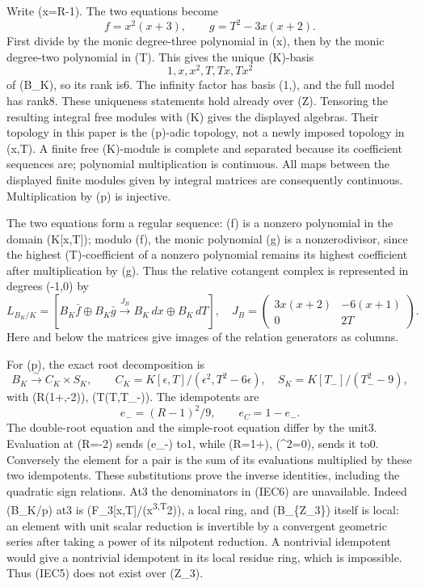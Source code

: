 \documentclass[
]{article}
\begin{document}
Write (x=R-1). The two equations become \[
f=x^2(x+3),\qquad g=T^2-3x(x+2).
\tag{IEC2}
\] First divide by the monic degree-three polynomial in (x), then by the
monic degree-two polynomial in (T). This gives the unique (K)-basis \[
1,x,x^2,T,Tx,Tx^2
\tag{IEC3}
\] of (B\_K), so its rank is6. The infinity factor has basis (1,\Theta),
and the full model has rank8. These uniqueness statements hold already
over (\mathbb Z). Tensoring the resulting integral free modules with (K)
gives the displayed algebras. Their topology in this paper is the
(p)-adic topology, not a newly imposed topology in (x,T). A finite free
(K)-module is complete and separated because its coefficient sequences
are; polynomial multiplication is continuous. All maps between the
displayed finite modules given by integral matrices are consequently
continuous. Multiplication by (p) is injective.

The two equations form a regular sequence: (f) is a nonzero polynomial
in the domain (K{[}x,T{]}); modulo (f), the monic polynomial (g) is a
nonzerodivisor, since the highest (T)-coefficient of a nonzero
polynomial remains its highest coefficient after multiplication by (g).
Thus the relative cotangent complex is represented in degrees (-1,0) by
\[
L_{B_K/K}=\left[B_K\bar f\oplus B_K\bar g
\xrightarrow{J_B}B_K\,dx\oplus B_K\,dT\right],\quad
J_B=\begin{pmatrix}3x(x+2)&-6(x+1)\\0&2T\end{pmatrix}.
\tag{IEC4}
\] Here and below the matrices give images of the relation generators as
columns.

For (p), the exact root decomposition is \[
B_K\xrightarrow{\sim} C_K\times S_K,\qquad
C_K=K[\epsilon,T]/(\epsilon^2,T^2-6\epsilon),\quad
S_K=K[T_-]/(T_-^2-9),
\tag{IEC5}
\] with (R\mapsto(1+\epsilon,-2)), (T\mapsto(T,T\_-)). The idempotents
are \[
e_-=(R-1)^2/9,\qquad e_C=1-e_-.
\tag{IEC6}
\] The double-root equation and the simple-root equation differ by the
unit3. Evaluation at (R=-2) sends (e\_-) to1, while (R=1+\epsilon),
(\epsilon\^{}2=0), sends it to0. Conversely the element for a pair is
the sum of its evaluations multiplied by these two idempotents. These
substitutions prove the inverse identities, including the quadratic sign
relations. At3 the denominators in (IEC6) are unavailable. Indeed
(B\_K/p) at3 is (\mathbb F\_3{[}x,T{]}/(x\textsuperscript{3,T}2)), a
local ring, and (B\_\{\mathbb Z\_3\}) itself is local: an element with
unit scalar reduction is invertible by a convergent geometric series
after taking a power of its nilpotent reduction. A nontrivial idempotent
would give a nontrivial idempotent in its local residue ring, which is
impossible. Thus (IEC5) does not exist over (\mathbb Z\_3).
\end{document}
